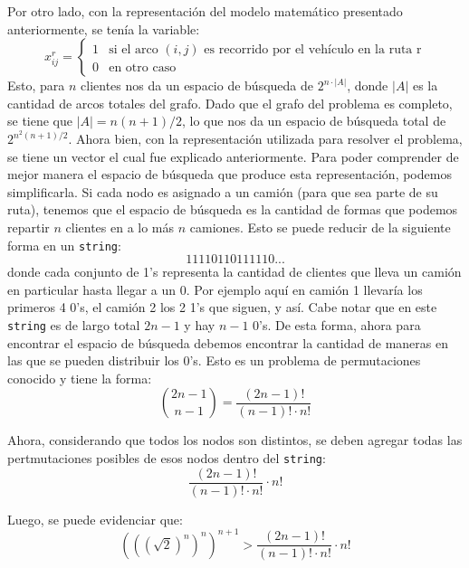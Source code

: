 \documentclass{article}
\begin{document}
Por otro lado, con la representación del modelo matemático presentado anteriormente, se tenía la variable:
\begin{equation*}
    x^r_{ij}= 
    \begin{cases}
        1 & \text{si el arco $(i,j)$ es recorrido por el vehículo en la ruta r}\\
        0 & \text{en otro caso}
    \end{cases}
\end{equation*}
Esto, para $n$ clientes nos da un espacio de búsqueda de $2^{n \cdot |A|}$, donde $|A|$ es la cantidad de arcos totales del grafo. Dado que el grafo del problema es completo, se tiene que $|A| = n(n+1)/2$, lo que nos da un espacio de búsqueda total de $2^{n^2(n+1)/2}$. Ahora bien, con la representación utilizada para resolver el problema, se tiene un vector el cual fue explicado anteriormente. Para poder comprender de mejor manera el espacio de búsqueda que produce esta representación, podemos simplificarla. Si cada nodo es asignado a un camión (para que sea parte de su ruta), tenemos que el espacio de búsqueda es la cantidad de formas que podemos repartir $n$ clientes en a lo más $n$ camiones. Esto se puede reducir de la siguiente forma en un \texttt{string}: $$11110110111110...$$ donde cada conjunto de 1's representa la cantidad de clientes que lleva un camión en particular hasta llegar a un 0. Por ejemplo aquí en camión 1 llevaría los primeros 4 0's, el camión 2 los 2 1's que siguen, y así. Cabe notar que en este \texttt{string} es de largo total $2n-1$ y hay $n-1$ 0's. De esta forma, ahora para encontrar el espacio de búsqueda debemos encontrar la cantidad de maneras en las que se pueden distribuir los 0's. Esto es un problema de permutaciones conocido y tiene la forma: 
\begin{equation*}
    \binom{2n-1}{n-1} = \frac{(2n-1)!}{(n-1)!\cdot n!}
\end{equation*}

Ahora, considerando que todos los nodos son distintos, se deben agregar todas las pertmutaciones posibles de esos nodos dentro del \texttt{string}:
\begin{equation*}
    \frac{(2n-1)!}{(n-1)!\cdot n!}\cdot n!
\end{equation*}

Luego, se puede evidenciar que:
\begin{equation*}
    \left(\left(\left(\sqrt{2}\right)^n\right)^n\right)^{n+1} > \frac{(2n-1)!}{(n-1)!\cdot n!}\cdot n!
\end{equation*}
\end{document}
